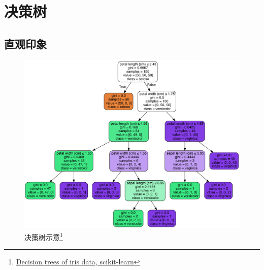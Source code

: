 
\section{决策树}
\subsection{直观印象}
\begin{frame}
    \begin{figure}[!tb]
        \includegraphics[width=\onepicwidth]{figure/decision_tree/iris}
        \caption{决策树示意\footnote{
                 \href{http://scikit-learn.org/stable/modules/tree.html}{Decision trees of iris data, scikit-learn}}}
    \end{figure}
\end{frame}



